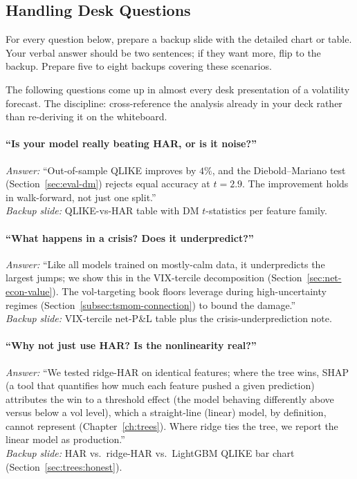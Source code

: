 \subsection{Handling Desk Questions}
\label{subsec:desk-qa}

\begin{prereq}
For every question below, prepare a backup slide with the detailed chart or table. Your verbal answer should be two sentences; if they want more, flip to the backup. Prepare five to eight backups covering these scenarios.
\end{prereq}

The following questions come up in almost every desk presentation of a volatility forecast. The discipline: cross-reference the analysis already in your deck rather than re-deriving it on the whiteboard.

\paragraph{``Is your model really beating HAR, or is it noise?''}
\emph{Answer:} ``Out-of-sample QLIKE improves by $4\%$, and the Diebold--Mariano test (Section~\ref{sec:eval-dm}) rejects equal accuracy at $t = 2.9$. The improvement holds in walk-forward, not just one split.''\\
\noindent\emph{Backup slide:} QLIKE-vs-HAR table with DM $t$-statistics per feature family.

\paragraph{``What happens in a crisis? Does it underpredict?''}
\emph{Answer:} ``Like all models trained on mostly-calm data, it underpredicts the largest jumps; we show this in the VIX-tercile decomposition (Section~\ref{sec:net-econ-value}). The vol-targeting book floors leverage during high-uncertainty regimes (Section~\ref{subsec:tsmom-connection}) to bound the damage.''\\
\noindent\emph{Backup slide:} VIX-tercile net-P\&L table plus the crisis-underprediction note.

\paragraph{``Why not just use HAR? Is the nonlinearity real?''}
\emph{Answer:} ``We tested ridge-HAR on identical features; where the tree wins, SHAP (a tool that quantifies how much each feature pushed a given prediction) attributes the win to a threshold effect (the model behaving differently above versus below a vol level), which a straight-line (linear) model, by definition, cannot represent (Chapter~\ref{ch:trees}). Where ridge ties the tree, we report the linear model as production.''\\
\noindent\emph{Backup slide:} HAR vs.\ ridge-HAR vs.\ LightGBM QLIKE bar chart (Section~\ref{sec:trees:honest}).

